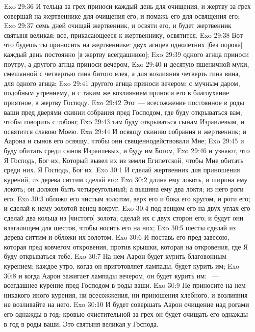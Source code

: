 \vs Exo 29:36 И тельца за грех приноси каждый день для очищения, и жертву за грех совершай на жертвеннике для очищения его, и помажь его для освящения его;
\vs Exo 29:37 семь дней очищай жертвенник, и освяти его, и будет жертвенник святыня великая: все, прикасающееся к жертвеннику, освятится.
\rsbpar\vs Exo 29:38 Вот что будешь ты приносить на жертвеннике: двух агнцев однолетних [без порока] каждый день постоянно [в жертву всегдашнюю];
\vs Exo 29:39 одного агнца приноси поутру, а другого агнца приноси вечером,
\vs Exo 29:40 и десятую  пшеничной муки, смешанной с четвертью гина битого елея, а для возлияния четверть гина вина, для одного агнца;
\vs Exo 29:41 другого агнца приноси вечером: с мучным даром, подобным утреннему, и с таким же возлиянием приноси его в благоухание приятное, в жертву Господу.
\vs Exo 29:42 Это~--- всесожжение постоянное в роды ваши пред дверями скинии собрания пред Господом, где буду открываться вам, чтобы говорить с тобою;
\vs Exo 29:43 там буду открываться сынам Израилевым, и освятится  славою Моею.
\vs Exo 29:44 И освящу скинию собрания и жертвенник; и Аарона и сынов его освящу, чтобы они священнодействовали Мне;
\vs Exo 29:45 и буду обитать среди сынов Израилевых, и буду им Богом,
\vs Exo 29:46 и узнают, что Я Господь, Бог их, Который вывел их из земли Египетской, чтобы Мне обитать среди них. Я Господь, Бог их.
\vs Exo 30:1 И сделай жертвенник для приношения курений, из дерева ситтим сделай его:
\vs Exo 30:2 длина ему локоть, и ширина ему локоть; он должен быть четыреугольный; а вышина ему два локтя; из него  роги его;
\vs Exo 30:3 обложи его чистым золотом, верх его и бока его кругом, и роги его; и сделай к нему золотой венец вокруг;
\vs Exo 30:4 под венцом его на двух углах его сделай два кольца из [чистого] золота; сделай их с двух сторон его; и будут они влагалищем для шестов, чтобы носить его на них;
\vs Exo 30:5 шесты сделай из дерева ситтим и обложи их золотом.
\vs Exo 30:6 И поставь его пред завесою, которая пред ковчегом откровения, против крышки, которая на  откровения, где Я буду открываться тебе.
\rsbpar\vs Exo 30:7 На нем Аарон будет курить благовонным курением; каждое утро, когда он приготовляет лампады, будет курить им;
\vs Exo 30:8 и когда Аарон зажигает лампады вечером, он будет курить им: ~--- всегдашнее курение пред Господом в роды ваши.
\vs Exo 30:9 Не приносите на нем никакого иного курения, ни всесожжения, ни приношения хлебного, и возлияния не возливайте на него.
\vs Exo 30:10 И будет совершать Аарон очищение над рогами его однажды в год; кровью очистительной  за грех он будет очищать его однажды в год в роды ваши. Это святыня великая у Господа.
